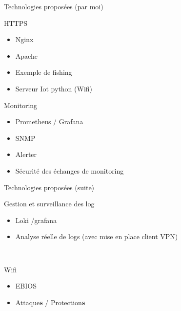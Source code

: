 \documentclass[12pt, handout]{beamer}
\begin{document}
\begin{frame}{Technologies proposées (par moi)}

\begin{block}{HTTPS}
\begin{itemize}
\item Nginx
\item Apache
\item Exemple de fishing
\item Serveur Iot python (Wifi)
\end{itemize}
\end{block}


\begin{block}{Monitoring}
\begin{itemize}
\item Prometheus / Grafana
\item SNMP
\item Alerter 
\item Sécurité des échanges de monitoring
\end{itemize}
\end{block}
\end{frame}

\begin{frame}{Technologies proposées (suite)}

\begin{block}{Gestion et surveillance des log}
\begin{itemize}
\item Loki /grafana
\item Analyse réelle de logs (avec mise en place client VPN)
\end{itemize}
\end{block}
\

\begin{block}{Wifi}
\begin{itemize}
\item EBIOS
\item Attaque\textbf{s} / Protection\textbf{s}
\end{itemize}
\end{block}
\end{frame}
\end{document}
